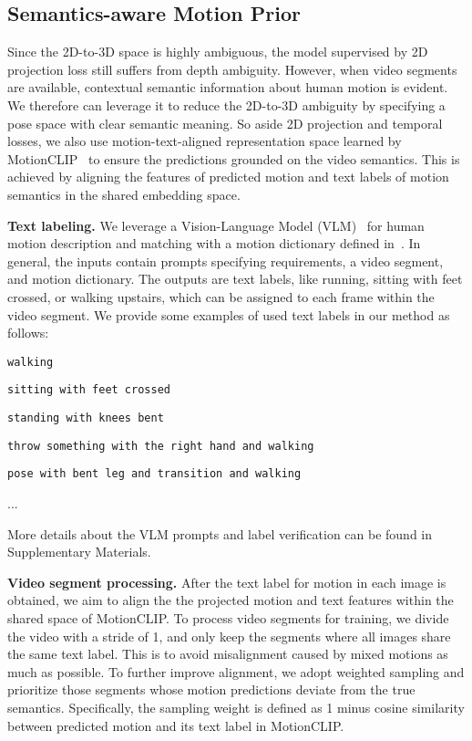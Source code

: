 \label{sec:method}
{\subsection{Semantics-aware Motion Prior}}\label{sec:alignment}

Since the 2D-to-3D space is highly ambiguous, {the model supervised by 2D projection loss still suffers from depth ambiguity}.
However, when video segments are available, contextual semantic information about human motion is evident. We therefore can leverage it to reduce the 2D-to-3D ambiguity by specifying a pose space with clear semantic meaning. 
So aside 2D projection and temporal losses, we also use motion-text-aligned representation space learned by MotionCLIP~\cite{motionclip} to 
ensure the predictions grounded on the video semantics.  
This is achieved by aligning the features of predicted motion and text labels of motion semantics in the shared embedding space. 

\noindent\textbf{Text labeling.} We leverage a Vision-Language Model (VLM)~\cite{gpt4} for {human motion description and matching} with a motion dictionary defined in~\cite{BABEL}.
In general, 
the inputs contain prompts specifying requirements, a video segment, and motion dictionary. 
The outputs are text labels, like running, sitting with feet crossed, or walking upstairs, which can be assigned to each frame within the video segment.
We provide some examples of used text labels in our method as follows:
\begin{tcolorbox}[
    colframe=black,    
    colback=white,     
    sharp corners,     
    width=\linewidth,   
    boxrule=0.2mm,      
]
\scriptsize
\texttt{walking}

\texttt{sitting with feet crossed}

\texttt{standing with knees bent}

\texttt{throw something with the right hand and walking}

\texttt{pose with bent leg and transition and walking}

...
\end{tcolorbox}
\noindent 
More details about the VLM prompts and label verification can be found in Supplementary Materials.


\noindent\textbf{Video segment processing.} 
After the text label for motion in each image is obtained, we aim to align the 
the projected motion and text features within the shared space of MotionCLIP. 
To process video segments for training, we divide the video with {a stride of 1},
and only keep the segments where all images share the same text label. This is to avoid misalignment caused by mixed motions as much as possible.
To further improve alignment, 
we adopt weighted sampling and prioritize those segments whose 
motion predictions deviate from the true semantics. 
Specifically, the sampling weight is defined as 1 minus cosine similarity between predicted motion and its text label in MotionCLIP.


